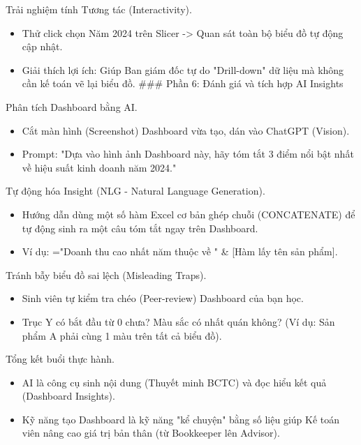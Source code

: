 \documentclass[aspectratio=169]{beamer}
\begin{document}
\begin{frame}{Trải nghiệm tính Tương tác (Interactivity).}
    \begin{itemize}
        \item Thử click chọn Năm 2024 trên Slicer -> Quan sát toàn bộ biểu đồ tự động cập nhật.
        \item Giải thích lợi ích: Giúp Ban giám đốc tự do "Drill-down" dữ liệu mà không cần kế toán vẽ lại biểu đồ.
        ### Phần 6: Đánh giá và tích hợp AI Insights
    \end{itemize}
\end{frame}


\begin{frame}{Phân tích Dashboard bằng AI.}
    \begin{itemize}
        \item Cắt màn hình (Screenshot) Dashboard vừa tạo, dán vào ChatGPT (Vision).
        \item Prompt: "Dựa vào hình ảnh Dashboard này, hãy tóm tắt 3 điểm nổi bật nhất về hiệu suất kinh doanh năm 2024."
    \end{itemize}
\end{frame}


\begin{frame}{Tự động hóa Insight (NLG - Natural Language Generation).}
    \begin{itemize}
        \item Hướng dẫn dùng một số hàm Excel cơ bản ghép chuỗi (CONCATENATE) để tự động sinh ra một câu tóm tắt ngay trên Dashboard.
        \item Ví dụ: ="Doanh thu cao nhất năm thuộc về " \& [Hàm lấy tên sản phẩm].
    \end{itemize}
\end{frame}


\begin{frame}{Tránh bẫy biểu đồ sai lệch (Misleading Traps).}
    \begin{itemize}
        \item Sinh viên tự kiểm tra chéo (Peer-review) Dashboard của bạn học.
        \item Trục Y có bắt đầu từ 0 chưa? Màu sắc có nhất quán không? (Ví dụ: Sản phẩm A phải cùng 1 màu trên tất cả biểu đồ).
    \end{itemize}
\end{frame}


\begin{frame}{Tổng kết buổi thực hành.}
    \begin{itemize}
        \item AI là công cụ sinh nội dung (Thuyết minh BCTC) và đọc hiểu kết quả (Dashboard Insights).
        \item Kỹ năng tạo Dashboard là kỹ năng "kể chuyện" bằng số liệu giúp Kế toán viên nâng cao giá trị bản thân (từ Bookkeeper lên Advisor).
    \end{itemize}
\end{frame}
\end{document}
